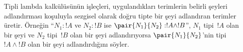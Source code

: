 Tipli lambda kalkülüsünün işleçleri, uygulandıkları terimlerin belirli
şeyleri adlandırması koşuluyla sezgisel olarak doğru tipte bir şeyi adlandıran
terimler üretir. Örneğin ``$N_1 : !A$ ve $N_2 : !B$ ise
$\pair{N_1}{N_2} : !A \land !B$'', $N_1$ tipi~$!A$ olan bir şeyi ve $N_2$
tipi~$!B$ olan bir şeyi adlandırıyorsa $\pair{N_1}{N_2}$'nin tipi
$!A \land !B$ olan bir şeyi adlandırdığını söyler.

